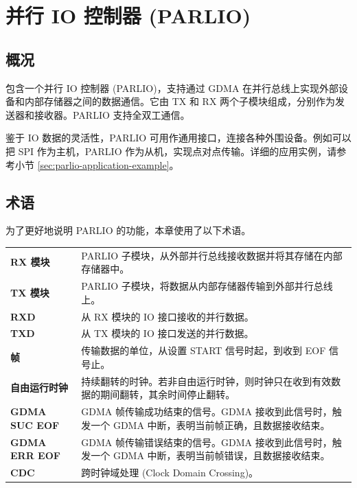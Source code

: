 \documentclass[main\_\_CN.tex]{subfiles}
\begin{document}

\ifglobal
\else
    \listoftodos
    {\let\clearpage\relax \listofdonetodos}
    \tableofcontents
\fi



\hypertarget{parlio}{}
\chapter{并行 IO 控制器 (PARLIO)}
\label{mod:parlio}



\section{概况}

\chipname{} 包含一个并行 IO 控制器 (PARLIO)，支持通过 GDMA 在并行总线上实现外部设备和内部存储器之间的数据通信。它由 TX 和 RX 两个子模块组成，分别作为发送器和接收器。PARLIO 支持全双工通信。

鉴于 IO 数据的灵活性，PARLIO 可用作通用接口，连接各种外围设备。例如可以把 SPI 作为主机，PARLIO 作为从机，实现点对点传输。详细的应用实例，请参考小节 \ref{sec:parlio-application-example}。

\section{术语}
为了更好地说明 PARLIO 的功能，本章使用了以下术语。

\begin{longtable}[c]{ R{4cm} p{10cm} }

\textbf{RX 模块}      & PARLIO 子模块，从外部并行总线接收数据并将其存储在内部存储器中。 \\
\textbf{TX 模块}      & PARLIO 子模块，将数据从内部存储器传输到外部并行总线上。 \\
\textbf{RXD}          & 从 RX 模块的 IO 接口接收的并行数据。 \\
\textbf{TXD}          & 从 TX 模块的 IO 接口发送的并行数据。  \\
\textbf{帧}           & 传输数据的单位，从设置 START 信号时起，到收到 EOF 信号止。 \\
\textbf{自由运行时钟} & 持续翻转的时钟。若非自由运行时钟，则时钟只在收到有效数据的期间翻转，其余时间停止翻转。\\
\textbf{GDMA SUC EOF} & GDMA 帧传输成功结束的信号。GDMA 接收到此信号时，触发一个 GDMA 中断，表明当前帧正确，且数据接收结束。 \\
\textbf{GDMA ERR EOF} & GDMA 帧传输错误结束的信号。GDMA 接收到此信号时，触发一个 GDMA 中断，表明当前帧错误，且数据接收结束。 \\
\textbf{CDC}          & 跨时钟域处理 (Clock Domain Crossing)。 \\

\end{longtable}
\end{document}
